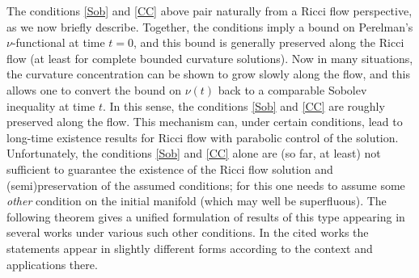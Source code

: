 \documentclass{amsart}
\theoremstyle{definition}
\begin{document}
The conditions \eqref{Sob} and \eqref{CC} above pair naturally from a Ricci flow perspective, as we now briefly describe.  Together, the conditions imply a bound on Perelman's $\nu$-functional at time $t=0$, and this bound is generally preserved along the Ricci flow (at least for complete bounded curvature solutions).  Now in many situations, the curvature concentration can be shown to grow slowly along the flow, and this allows one to convert the bound on $\nu(t)$ back to a comparable Sobolev inequality at time $t$.  In this sense, the conditions \eqref{Sob} and \eqref{CC} are roughly preserved along the flow.  This mechanism can, under certain conditions, lead to long-time existence results for Ricci flow with parabolic control of the solution. Unfortunately, the conditions \eqref{Sob} and \eqref{CC} alone are (so far, at least) not sufficient to guarantee the existence of the Ricci flow solution and (semi)preservation of the assumed conditions; for this one needs to assume  some \textit{other} condition on the initial manifold (which may well be superfluous). The following theorem gives a unified formulation of results of this type appearing in several works under various such other conditions. In the cited works the statements appear in slightly different forms according to the context and applications there.
\end{document}
